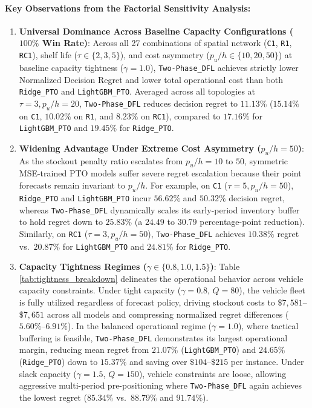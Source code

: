 \documentclass[11pt,a4paper]{article}
\theoremstyle{definition}
\theoremstyle{remark}
\begin{document}
\paragraph{Key Observations from the Factorial Sensitivity Analysis:}
\begin{enumerate}[label=(\roman*)]
    \item \textbf{Universal Dominance Across Baseline Capacity Configurations ($100\%$ Win Rate)}: Across all 27 combinations of spatial network (\texttt{C1}, \texttt{R1}, \texttt{RC1}), shelf life ($\tau \in \{2, 3, 5\}$), and cost asymmetry ($p_u/h \in \{10, 20, 50\}$) at baseline capacity tightness ($\gamma = 1.0$), \texttt{Two-Phase\_DFL} achieves strictly lower Normalized Decision Regret and lower total operational cost than both \texttt{Ridge\_PTO} and \texttt{LightGBM\_PTO}. Averaged across all topologies at $\tau = 3, p_u/h = 20$, \texttt{Two-Phase\_DFL} reduces decision regret to $11.13\%$ ($15.14\%$ on \texttt{C1}, $10.02\%$ on \texttt{R1}, and $8.23\%$ on \texttt{RC1}), compared to $17.16\%$ for \texttt{LightGBM\_PTO} and $19.45\%$ for \texttt{Ridge\_PTO}.
    \item \textbf{Widening Advantage Under Extreme Cost Asymmetry ($p_u/h = 50$)}: As the stockout penalty ratio escalates from $p_u/h = 10$ to $50$, symmetric MSE-trained PTO models suffer severe regret escalation because their point forecasts remain invariant to $p_u/h$. For example, on \texttt{C1} ($\tau = 5, p_u/h = 50$), \texttt{Ridge\_PTO} and \texttt{LightGBM\_PTO} incur $56.62\%$ and $50.32\%$ decision regret, whereas \texttt{Two-Phase\_DFL} dynamically scales its early-period inventory buffer to hold regret down to $25.83\%$ (a $24.49$ to $30.79$ percentage-point reduction). Similarly, on \texttt{RC1} ($\tau = 3, p_u/h = 50$), \texttt{Two-Phase\_DFL} achieves $10.38\%$ regret vs.\ $20.87\%$ for \texttt{LightGBM\_PTO} and $24.81\%$ for \texttt{Ridge\_PTO}.
    \item \textbf{Capacity Tightness Regimes ($\gamma \in \{0.8, 1.0, 1.5\}$)}: Table \ref{tab:tightness_breakdown} delineates the operational behavior across vehicle capacity constraints. Under tight capacity ($\gamma = 0.8$, $Q = 80$), the vehicle fleet is fully utilized regardless of forecast policy, driving stockout costs to $\$7,581$--$\$7,651$ across all models and compressing normalized regret differences ($5.60\%$--$6.91\%$). In the balanced operational regime ($\gamma = 1.0$), where tactical buffering is feasible, \texttt{Two-Phase\_DFL} demonstrates its largest operational margin, reducing mean regret from $21.07\%$ (\texttt{LightGBM\_PTO}) and $24.65\%$ (\texttt{Ridge\_PTO}) down to $15.37\%$ and saving over $\$104$--$\$215$ per instance. Under slack capacity ($\gamma = 1.5$, $Q = 150$), vehicle constraints are loose, allowing aggressive multi-period pre-positioning where \texttt{Two-Phase\_DFL} again achieves the lowest regret ($85.34\%$ vs.\ $88.79\%$ and $91.74\%$).

\end{enumerate}
\end{document}
